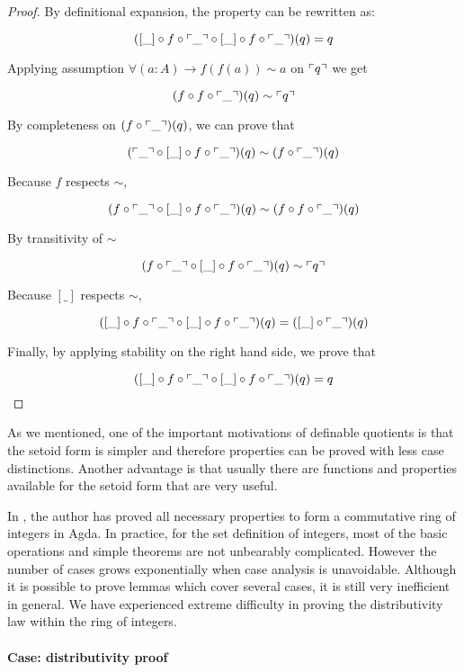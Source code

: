 \begin{proof}
By definitional expansion, the property can be rewritten as:

$$([\_] \circ f \circ \ulcorner\_\urcorner \circ [\_] \circ f \circ \ulcorner\_\urcorner)(q) = q$$

Applying assumption $\forall (a : A) \to f (f (a)) \sim a$ on $\ulcorner q\urcorner$ we get

$$(f \circ f \circ \ulcorner\_\urcorner) (q) \sim \ulcorner q\urcorner$$

By completeness on $(f \circ \ulcorner\_\urcorner) (q)$, we can prove that

$$ (\ulcorner\_\urcorner \circ [\_] \circ f \circ \ulcorner\_\urcorner) (q) \sim  (f \circ \ulcorner\_\urcorner) (q) $$

Because $f$ respects $\sim$,

$$ (f \circ \ulcorner\_\urcorner \circ [\_] \circ  f \circ \ulcorner\_\urcorner) (q) \sim  (f \circ f \circ \ulcorner\_\urcorner) (q) $$

By transitivity of $\sim$

$$(f \circ \ulcorner\_\urcorner \circ [\_] \circ  f \circ \ulcorner\_\urcorner) (q) \sim \ulcorner q\urcorner$$


Because $[\_]$ respects $\sim$,


$$([\_] \circ f \circ \ulcorner\_\urcorner \circ [\_] \circ f \circ \ulcorner\_\urcorner) (q) = ([\_] \circ \ulcorner\_\urcorner)(q)$$

Finally, by applying stability on the right hand side, we prove that


$$([\_] \circ f \circ \ulcorner\_\urcorner \circ [\_] \circ f \circ \ulcorner\_\urcorner)(q) = q$$
\end{proof}


As we mentioned, one of the important motivations of definable quotients is that the setoid form is simpler and therefore properties can be proved with less case distinctions. Another advantage is that usually there are functions and properties available for the setoid form that are very useful. 

In \cite{finalyear}, the author has proved all necessary properties to form a commutative ring of integers in Agda.
In practice, for the set definition of integers, most of the basic operations and simple theorems are not unbearably complicated. However the number of
cases grows exponentially when case analysis is unavoidable.
Although it is possible to prove lemmas which cover several cases, it is still very inefficient in general. We have experienced extreme difficulty in proving the distributivity law within the ring of integers.

\paragraph{Case: distributivity proof}

